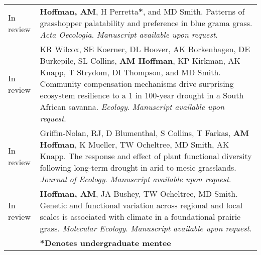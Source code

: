 \documentclass[letterpaper]{deedy-resume} %
\begin{document}
\begin{tabular}{>{\raggedleft\arraybackslash}p{2cm}p{16cm}}
In review & \textbf{Hoffman, AM}, H Perretta\textbf{*}, and MD Smith. Patterns of grasshopper palatability and preference in blue grama grass. \textcolor{special}{\textit{Acta Oecologia}}. \textit{Manuscript available upon request}.\\

In review & KR Wilcox, SE Koerner, DL Hoover, AK Borkenhagen, DE Burkepile, SL Collins, \textbf{AM Hoffman}, KP Kirkman, AK Knapp, T Strydom, DI Thompson, and MD Smith. Community compensation mechanisms drive surprising ecosystem resilience to a 1 in 100-year drought in a South African savanna. \textcolor{special}{\textit{Ecology}}. \textit{Manuscript available upon request}.\\

In review & Griffin-Nolan, RJ, D Blumenthal, S Collins, T Farkas, \textbf{AM Hoffman}, K Mueller, TW Ocheltree, MD Smith, AK Knapp. The response and effect of plant functional diversity following long-term drought in arid to mesic grasslands. \textcolor{special}{\textit{Journal of Ecology}}. \textit{Manuscript available upon request}.\\

In review & \textbf{Hoffman, AM}, JA Bushey, TW Ocheltree, MD Smith. Genetic and functional variation across regional and local scales is associated with climate in a foundational prairie grass. \textcolor{special}{\textit{Molecular Ecology}}. \textit{Manuscript available upon request}.\\

&\textbf{*Denotes undergraduate mentee}\\

\end{tabular}
\sectionspace

%

\end{document}
